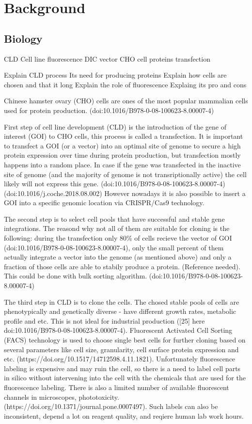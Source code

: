 \section{Background}
\subsection{Biology}
CLD
Cell line
fluorescence
DIC
vector
CHO cell
proteins
transfection

Explain CLD process
Its need for producing proteins
Explain how cells are chosen and that it long
Explain the role of fluorescence
Explaing its pro and cons

Chinese hamster ovary (CHO) cells are ones of the most popular mammalian cells used for protein production. (doi:10.1016/B978-0-08-100623-8.00007-4) 

First step of cell line development (CLD) is the
introduction of the gene of interest (GOI) to CHO cells, this process is called a transfection. It is important to transfect a GOI (or a vector) into an optimal site of genome to secure a high protein expression over time during protein production, but transfection mostly happens into a random place. In case if the gene was transfected in the inactive site of genome (and the majority of genome is not transriptionally active) the cell likely will not express this gene. (doi:10.1016/B978-0-08-100623-8.00007-4) (doi:10.1016/j.coche.2018.08.002) However nowadays it is also possible to insert a GOI into a specific genomic location via CRISPR/Cas9 technology. 

The second step is to select cell pools that have successful and stable gene integrations. The reasond why not all of them are suitable for cloning is the following: during the transfection only 80\% of cells recieve the vector of GOI (doi:10.1016/B978-0-08-100623-8.00007-4), only the small percent of them actually integrate a vector into the genome (as mentioned above) and only a fraction of those cells are able to stabily produce a protein. (Reference needed). This could be done with bulk sorting algorithm. (doi:10.1016/B978-0-08-100623-8.00007-4)

The third step in CLD is to clone the cells. The chosed stable pools of cells are phenotypically and genetically diverse - have different growth rates, metabolic profile and etc. This is not ideal for industrial production ([25] here doi:10.1016/B978-0-08-100623-8.00007-4). Fluorescent Activated Cell Sorting (FACS) technology is used to choose single best cells for further cloning based on several parameters like cell size, granularity, cell surface protein expression and etc. (https://doi.org/10.1517/14712598.4.11.1821). Unfortunately fluorescence labeling is expensive and may ruin the cell, so there is a need to label cell parts in silico without intervening into the cell with the chemicals that are used for the fluorescence labeling. There is also a limited number of available fluorescent channels in microscopes, phototoxicity. (https://doi.org/10.1371/journal.pone.0007497). Such labels can also be inconsistent, depend a lot on reagent quality, and reqiere human lab work hours.

